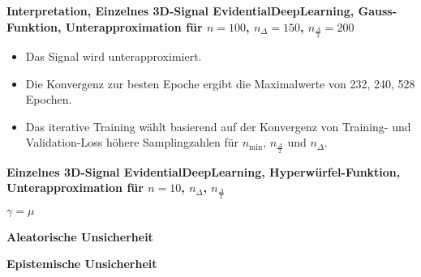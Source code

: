 \begin{otherlanguage}{ngerman}
\begin{samepage}
\begin{minipage}{\textwidth}

\noindent\textbf{Interpretation, Einzelnes 3D-Signal \gls{EvidentialDeepLearning}, Gauss-Funktion,
Unterapproximation für $n=100$, $n_{\Delta}=150$, $n_{\frac{\Delta}{2}}=200$}

\begin{itemize}
    \item Das Signal wird unterapproximiert.
    \item Die Konvergenz zur besten Epoche ergibt die Maximalwerte von 232, 240, 528 Epochen.
    \item Das iterative Training wählt basierend auf der Konvergenz von Training- und Validation-Loss höhere Samplingzahlen für $n_{\min}$, $n_{\frac{\Delta}{2}}$ und $n_{\Delta}$.
\end{itemize}




\end{minipage}
\end{samepage}



\clearpage


\begin{samepage}
\begin{minipage}{\textwidth}

\noindent\textbf{Einzelnes 3D-Signal \gls{EvidentialDeepLearning}, Hyperwürfel-Funktion,
Unterapproximation für $n=10$, $n_{\Delta}$, $n_{\frac{\Delta}{2}}$}


\begin{minipage}{0.05\textwidth}\vspace{0.5cm}\end{minipage}%
\begin{minipage}{0.3\textwidth}\centering \textbf{$\gamma=\mu$}\end{minipage}%
\begin{minipage}{0.3\textwidth}\centering \textbf{Aleatorische Unsicherheit}\end{minipage}%
\begin{minipage}{0.3\textwidth}\centering \textbf{Epistemische Unsicherheit}\end{minipage}


\end{minipage}
\end{samepage}
\end{otherlanguage}
